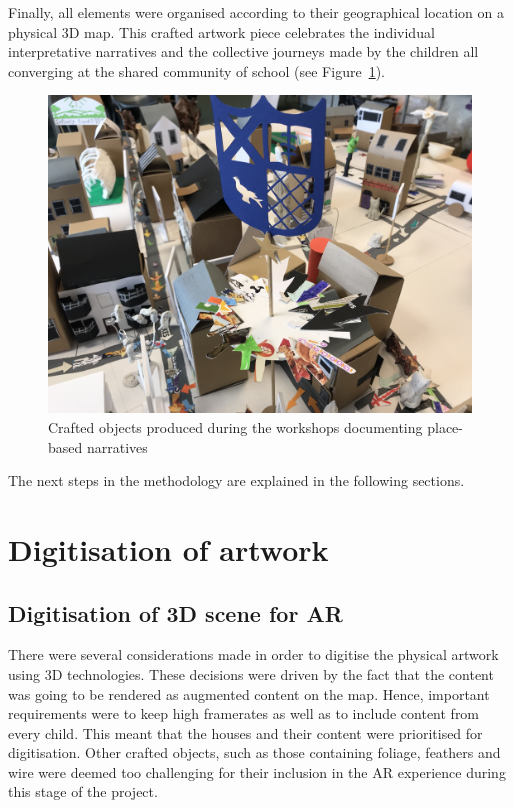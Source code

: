 \documentclass[acmlarge,screen,dvipsnames]{acmart}
\begin{document}
Finally, all elements were organised according to their geographical location
on a physical 3D map. This crafted artwork piece celebrates the individual
interpretative narratives and the collective journeys made by the children all
converging at the shared community of school (see Figure~\ref{fig:artwork}). 

\begin{figure}[ht] \centering
\includegraphics[width=\linewidth]{images/variousassets.jpg}
\caption{Crafted objects produced during the workshops documenting place-based
narratives} \label{fig:artwork} \end{figure}

The next steps in the methodology are explained in the following sections.

\section{Digitisation of artwork} 
\label{dig} 

\subsection{Digitisation of 3D scene for AR} There were several considerations
made in order to digitise the physical artwork using 3D technologies. These
decisions were driven by the fact that the content was going to be rendered as
augmented content on the map. Hence, important requirements were to keep high
framerates as well as to include content from every child. This meant that the
houses and their content were prioritised for digitisation. Other crafted objects, 
such as those containing foliage, feathers and wire were deemed too challenging 
for their inclusion in the AR experience during this stage of the project.
\end{document}
